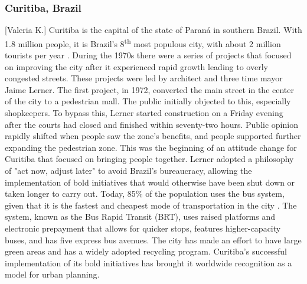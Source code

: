 \documentclass[12pt]{article}                               %
\begin{document}
\subsubsection{Curitiba, Brazil}[Valeria K.]
Curitiba is the capital of the state of Paraná in southern Brazil. With 1.8 million people, it is Brazil's 8\textsuperscript{th} most populous city, with about 2 million tourists per year \cite{Adler2016StoryCapital}. During the 1970s there were a series of projects that focused on improving the city after it experienced rapid growth leading to overly congested streets. These projects were led by architect and three time mayor Jaime Lerner. The first project, in 1972, converted the main street in the center of the city to a pedestrian mall. The public initially objected to this, especially shopkeepers. To bypass this, Lerner started construction on a Friday evening after the courts had closed and finished within seventy-two hours. Public opinion rapidly shifted when people saw the zone's benefits, and people supported further expanding the pedestrian zone. This was the beginning of an attitude change for Curitiba that focused on bringing people together. Lerner adopted a philosophy of "act now, adjust later" to avoid Brazil's bureaucracy, allowing the implementation of bold initiatives that would otherwise have been shut down or taken longer to carry out. Today, 85\% of the population uses the bus system, given that it is the fastest and cheapest mode of transportation in the city \cite{Adler2016StoryCapital}. The system, known as the Bus Rapid Transit (BRT), uses raised platforms and electronic prepayment that allows for quicker stops, features higher-capacity buses, and has five express bus avenues. The city has made an effort to have large green areas and has a widely adopted recycling program. Curitiba's successful implementation of its bold initiatives has brought it worldwide recognition as a model for urban planning.
\end{document}
